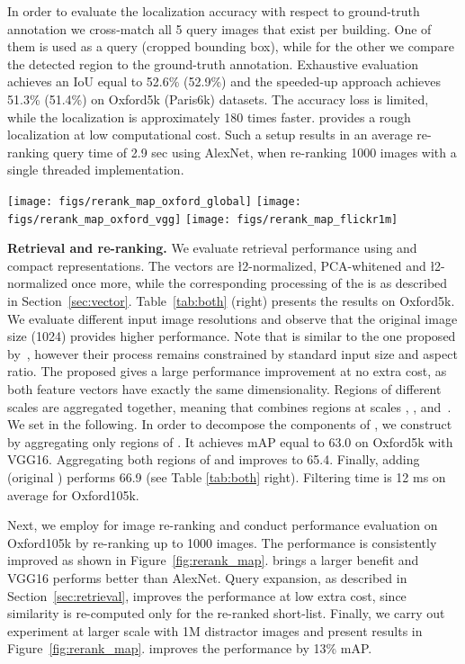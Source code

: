 In order to evaluate the localization accuracy with respect to ground-truth annotation we cross-match all 5 query images that exist per building.
One of them is used as a query (cropped bounding box), while for the other we compare the detected region to the ground-truth annotation.
Exhaustive evaluation achieves an IoU equal to 52.6\% (52.9\%) and the speeded-up approach achieves 51.3\% (51.4\%) on Oxford5k (Paris6k) datasets.
The accuracy loss is limited, while the localization is approximately 180 times faster. 
\deeploc provides a rough localization at low computational cost.
Such a setup results in an average re-ranking query time of 2.9 sec using AlexNet, when re-ranking 1000 images with a single threaded implementation. 
\begin{figure*}
\centering
  \texttt{[image: figs/rerank\_map\_oxford\_global]}
\hfill
  \texttt{[image: figs/rerank\_map\_oxford\_vgg]}
  \hfill
 \texttt{[image: figs/rerank\_map\_flickr1m]}
\caption{Performance of retrieval with re-ranking by \deeploc versus number of re-ranked images on Oxford105k and Oxford5k combined with 1M distractor images.
\label{fig:rerank_map}}
\end{figure*}

\textbf{Retrieval and re-ranking.}
We evaluate retrieval performance using \gfv and \rfv compact representations.
The \gfv vectors are \l2-normalized, PCA-whitened and \l2-normalized once more, while the corresponding processing of the \rfv is as described in Section~\ref{sec:vector}. Table~\ref{tab:both} (right) presents the results on Oxford5k.
We evaluate different input image resolutions and observe that the original image size (1024) provides higher performance.
Note that \gfv is similar to the one proposed by~\cite{ARSM+14}, however their process remains constrained by  standard input size and aspect ratio.
The proposed \rfv gives a large performance improvement at no extra cost, as both feature vectors have exactly the same dimensionality.
Regions of different scales are aggregated together, meaning that  combines regions at scales , , and~.
We set  in the following. 
In order to decompose the components of \rfv, we construct \rfv by aggregating only regions of . It achieves mAP equal to 63.0 on Oxford5k with VGG16. 
Aggregating both regions of  and  improves to 65.4.
Finally, adding  (original \rfv) performs 66.9 (see Table \ref{tab:both} right).
Filtering time is 12 ms on average for Oxford105k. 

Next, we employ \deeploc for image re-ranking and conduct performance evaluation on Oxford105k by re-ranking up to 1000 images.
The performance is consistently improved as shown in Figure~\ref{fig:rerank_map}.
\rfv brings a larger benefit and VGG16 performs better than AlexNet.
Query expansion, as described in Section~\ref{sec:retrieval}, improves the performance at low extra cost, since similarity is re-computed only for the re-ranked short-list.
Finally, we carry out experiment at larger scale with 1M distractor images and present results in Figure~\ref{fig:rerank_map}. \deeploc improves the performance by 13\% mAP.


